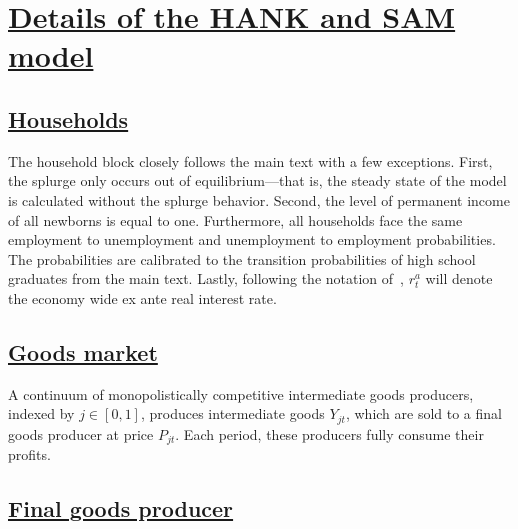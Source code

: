 \documentclass{econsocart}
\begin{document}
\FloatBarrier

\section{\href{https://econ-ark.github.io/HAFiscal/\#sec:appendix-hank}{Details of the HANK and SAM model}}
\whenintegrated{\label{sec:appendix-hank}} %


\subsection{\href{https://econ-ark.github.io/HAFiscal/\#sec:hank-households}{Households}}\whenintegrated{\label{sec:hank-households}}

The household block closely follows the main text with a few exceptions. First, the splurge only occurs out of equilibrium---that is, the steady state of the model is calculated without the splurge behavior. Second, the level of permanent income of all newborns is equal to one. Furthermore, all households face the same employment to unemployment and unemployment to employment probabilities. The probabilities are calibrated to the transition probabilities of high school graduates from the main text. Lastly, following the notation of~\cite{arsJumpsHumps}, $r^{a}_{t}$ will denote the economy wide ex ante real interest rate.

\subsection{\href{https://econ-ark.github.io/HAFiscal/\#sec:goods-market}{Goods market}}\whenintegrated{\label{sec:goods-market}}

A continuum of monopolistically competitive intermediate goods producers, indexed by \( j \in [0,1] \), produces intermediate goods \( Y_{jt} \), which are sold to a final goods producer at price \( P_{jt} \). Each period, these producers fully consume their profits.

\subsection{\href{https://econ-ark.github.io/HAFiscal/\#sec:hank-final-goods-producer}{Final goods producer}}\whenintegrated{\label{sec:hank-final-goods-producer}}
\end{document}
